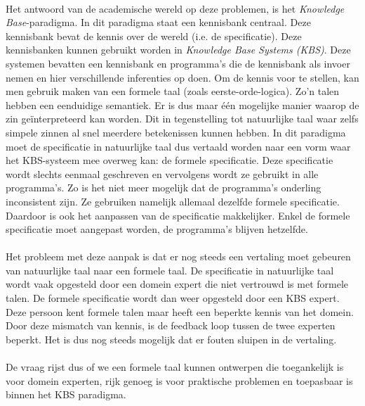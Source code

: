 \documentclass[]{article}
\theoremstyle{definition}
\begin{document}
\paragraph{} Het antwoord van de academische wereld op deze problemen, is het \textit{Knowledge Base}-paradigma. In dit paradigma staat een kennisbank centraal. Deze kennisbank bevat de kennis over de wereld (i.e. de specificatie). Deze kennisbanken kunnen gebruikt worden in \textit{Knowledge Base Systems (KBS)}. Deze systemen bevatten een kennisbank en programma's die de kennisbank als invoer nemen en hier verschillende inferenties op doen. Om de kennis voor te stellen, kan men gebruik maken van een formele taal (zoals eerste-orde-logica). Zo'n talen hebben een eenduidige semantiek. Er is dus maar één mogelijke manier waarop de zin geïnterpreteerd kan worden. Dit in tegenstelling tot natuurlijke taal waar zelfs simpele zinnen al snel meerdere betekenissen kunnen hebben. In dit paradigma moet de specificatie in natuurlijke taal dus vertaald worden naar een vorm waar het KBS-systeem mee overweg kan: de formele specificatie. Deze specificatie wordt slechts eenmaal geschreven en vervolgens wordt ze gebruikt in alle programma's. Zo is het niet meer mogelijk dat de programma's onderling inconsistent zijn. Ze gebruiken namelijk allemaal dezelfde formele specificatie. Daardoor is ook het aanpassen van de specificatie makkelijker. Enkel de formele specificatie moet aangepast worden, de programma's blijven hetzelfde.

\paragraph{} Het probleem met deze aanpak is dat er nog steeds een vertaling moet gebeuren van natuurlijke taal naar een formele taal. De specificatie in natuurlijke taal wordt vaak opgesteld door een domein expert die niet vertrouwd is met formele talen. De formele specificatie wordt dan weer opgesteld door een KBS expert. Deze persoon kent formele talen maar heeft een beperkte kennis van het domein. Door deze mismatch van kennis, is de feedback loop tussen de twee experten beperkt. Het is dus nog steeds mogelijk dat er fouten sluipen in de vertaling.

\paragraph{} De vraag rijst dus of we een formele taal kunnen ontwerpen die toegankelijk is voor domein experten, rijk genoeg is voor praktische problemen en toepasbaar is binnen het KBS paradigma.
\end{document}
